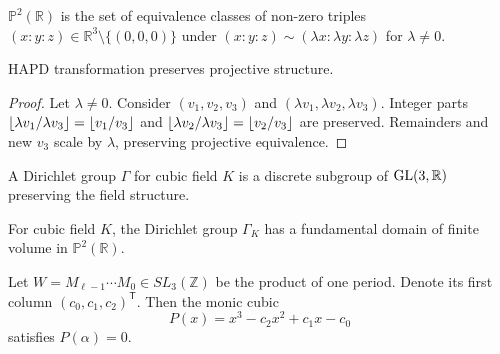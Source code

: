 \begin{definition}
$\mathbb{P}^2(\mathbb{R})$ is the set of equivalence classes of non-zero triples $(x : y : z) \in \mathbb{R}^3 \setminus \{(0,0,0)\}$ under $(x : y : z) \sim (\lambda x : \lambda y : \lambda z)$ for $\lambda \neq 0$.
\end{definition}

\begin{proposition}\label{prop:projective_invariance}
HAPD transformation preserves projective structure.
\end{proposition}

\begin{proof}
Let $\lambda \neq 0$. Consider $(v_1, v_2, v_3)$ and $(\lambda v_1, \lambda v_2, \lambda v_3)$. Integer parts $\lfloor \lambda v_1/\lambda v_3 \rfloor = \lfloor v_1/v_3 \rfloor$ and $\lfloor \lambda v_2/\lambda v_3 \rfloor = \lfloor v_2/v_3 \rfloor$ are preserved. Remainders and new $v_3$ scale by $\lambda$, preserving projective equivalence.
\end{proof}

\begin{definition}
A Dirichlet group $\Gamma$ for cubic field $K$ is a discrete subgroup of $\operatorname{GL}(3,\mathbb{R})$ preserving the field structure.
\end{definition}

\begin{theorem}\label{thm:finite_domain}
For cubic field $K$, the Dirichlet group $\Gamma_K$ has a fundamental domain of finite volume in $\mathbb{P}^2(\mathbb{R})$.
\end{theorem}

\begin{lemma}\label{lem:polynomial_reconstruction}
Let $W=M_{\ell-1}\cdots M_{0}\in SL_{3}(\mathbb{Z})$ be the product of one period.
Denote its first column $(c_{0},c_{1},c_{2})^{\mathsf{T}}$.
Then the monic cubic
\[
P(x)=x^{3}-c_{2}x^{2}+c_{1}x-c_{0}
\]
satisfies $P(\alpha)=0$.
\end{lemma}

